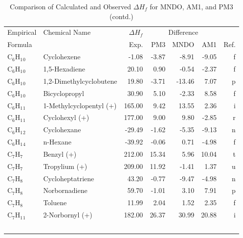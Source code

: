 \begin{table}
\caption{Comparison of Calculated and Observed $\Delta H_f$ 
for MNDO, AM1, and PM3 (contd.)}
\begin{center}
\compresstable
\begin{tabular}{llrrrrr}
Empirical & Chemical Name & $\Delta H_f$ & \multicolumn{3}{c}{Difference} & \\
Formula   &               & Exp. & PM3 &  MNDO  &  AM1 &     Ref.\\
\hline
 C$_6$H$_1$$_0$       & Cyclohexene                     &    -1.08    &    -3.87  &    -8.91  &    -9.05  &      f\\
 C$_6$H$_1$$_0$       & 1,5-Hexadiene                   &    20.10    &     0.90  &    -0.54  &    -2.37  &      f\\
 C$_6$H$_1$$_0$       & 1,2-Dimethylcyclobutene         &    19.80    &    -3.71  &   -13.46  &     7.07  &      p\\
 C$_6$H$_1$$_0$       & Bicyclopropyl                   &    30.90    &     5.10  &    -2.33  &     8.58  &      f\\
 C$_6$H$_1$$_1$       & 1-Methylcyclopentyl (+)         &   165.00    &     9.42  &    13.55  &     2.36  &      i\\
 C$_6$H$_1$$_1$       & Cyclohexyl (+)                  &   177.00    &     9.00  &     9.80  &    -2.85  &      r\\
 C$_6$H$_1$$_2$       & Cyclohexane                     &   -29.49    &    -1.62  &    -5.35  &    -9.13  &      n\\
 C$_6$H$_1$$_4$       & n-Hexane                        &   -39.92    &    -0.06  &     0.71  &    -4.98  &      f\\
 C$_7$H$_7$        & Benzyl (+)                      &   212.00    &    15.34  &     5.96  &    10.04  &      t\\
 C$_7$H$_7$        & Tropylium (+)                   &   209.00    &    11.92  &    -1.41  &     1.37  &      u\\
 C$_7$H$_8$        & Cycloheptatriene                &    43.20    &    -0.77  &    -9.47  &    -4.98  &      n\\
 C$_7$H$_8$        & Norbornadiene                   &    59.70    &    -1.01  &     3.10  &     7.91  &      p\\
 C$_7$H$_8$        & Toluene                         &    11.99    &     2.04  &     1.52  &     2.35  &      f\\
 C$_7$H$_1$$_1$       & 2-Norbornyl (+)                 &   182.00    &    26.37  &    30.99  &    20.88  &      i\\
$$
\end{tabular}
\end{center}
\end{table}
